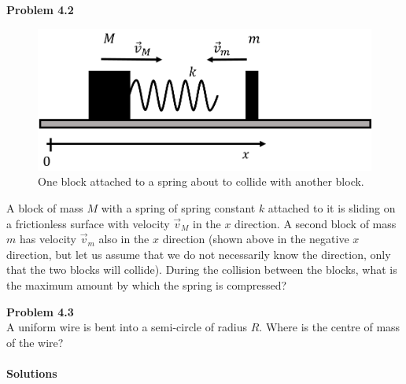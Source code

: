 \begin{framed}
\textbf{Problem 4.2}\\
\begin{figure}[!htbp]
\centering
\includegraphics[width=0.6\linewidth]{files/springcollision-e92881ea9bc239e7be1906e3102e5e0c.png}
\caption[]{One block attached to a spring about to collide with another block.}
\label{fig:momentumandcm:springcollision}
\end{figure}

A block of mass $M$ with a spring of spring constant $k$ attached to it is sliding on a frictionless surface with velocity $\vec v_M$ in the $x$ direction. A second block of mass $m$ has velocity $\vec v_m$ also in the $x$ direction (shown above in the negative $x$ direction, but let us assume that we do not necessarily know the direction, only  that the two blocks will collide). During the collision between the blocks, what is the maximum amount by which the spring is compressed?
\end{framed}

\begin{framed}
\textbf{Problem 4.3}\\
A uniform wire is bent into a semi-circle of radius $R$. Where is the centre of mass of the wire?
\end{framed}

\paragraph{Solutions}

